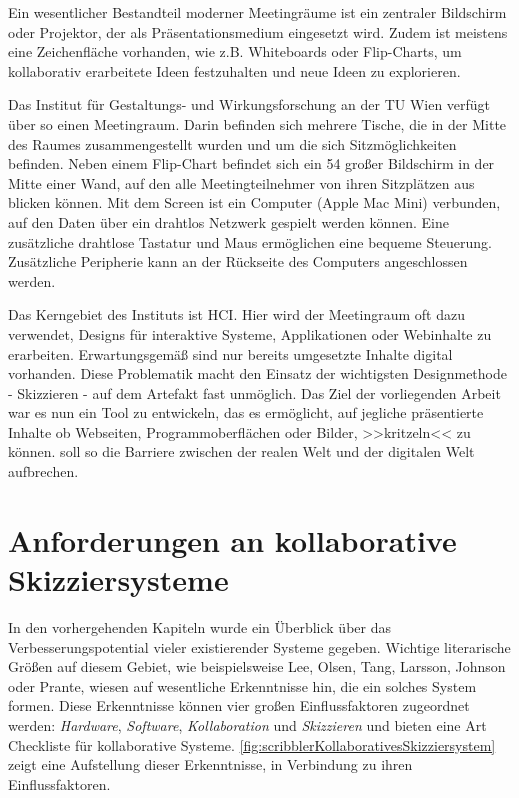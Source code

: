 Ein wesentlicher Bestandteil moderner Meetingräume ist ein zentraler Bildschirm oder Projektor, der als Präsentationsmedium eingesetzt wird. Zudem ist meistens eine Zeichenfläche vorhanden, wie z.B. Whiteboards oder Flip-Charts, um kollaborativ erarbeitete Ideen festzuhalten und neue Ideen zu explorieren.

\medskip Das Institut für Gestaltungs- und Wirkungsforschung an der TU Wien verfügt über so einen Meetingraum. Darin befinden sich mehrere Tische, die in der Mitte des Raumes zusammengestellt wurden und um die sich Sitzmöglichkeiten befinden. Neben einem Flip-Chart befindet sich ein {54\dq} großer Bildschirm in der Mitte einer Wand, auf den alle Meetingteilnehmer von ihren Sitzplätzen aus blicken können. Mit dem Screen ist ein Computer (Apple Mac Mini) verbunden, auf den Daten über ein drahtlos Netzwerk gespielt werden können. Eine zusätzliche drahtlose Tastatur und Maus ermöglichen eine bequeme Steuerung. Zusätzliche Peripherie kann an der Rückseite des Computers angeschlossen werden.

\medskip Das Kerngebiet des Instituts ist \ac{HCI}. Hier wird der Meetingraum oft dazu verwendet, Designs für interaktive Systeme, Applikationen oder Webinhalte zu erarbeiten. Erwartungsgemäß sind nur bereits umgesetzte Inhalte digital vorhanden. Diese Problematik macht den Einsatz der wichtigsten Designmethode - Skizzieren - auf dem Artefakt fast unmöglich. Das Ziel der vorliegenden Arbeit war es nun ein Tool zu entwickeln, das es ermöglicht, auf jegliche präsentierte Inhalte ob Webseiten, Programmoberflächen oder Bilder, >>kritzeln<< zu können. \scribbler soll so die Barriere zwischen der realen Welt und der digitalen Welt aufbrechen.

\section{Anforderungen an kollaborative Skizziersysteme} \label{sec:anforderungen} 
In den vorhergehenden Kapiteln wurde ein Überblick über das Verbesserungspotential vieler existierender Systeme gegeben. Wichtige literarische Größen auf diesem Gebiet, wie beispielsweise Lee, Olsen, Tang, Larsson, Johnson oder Prante, wiesen auf wesentliche Erkenntnisse hin, die ein solches System formen. Diese Erkenntnisse können vier großen Einflussfaktoren zugeordnet werden: \emph{Hardware}, \emph{Software}, \emph{Kollaboration} und \emph{Skizzieren} und bieten eine Art Checkliste für kollaborative Systeme. \autoref{fig:scribblerKollaborativesSkizziersystem} zeigt eine Aufstellung dieser Erkenntnisse, in Verbindung zu ihren Einflussfaktoren. 


